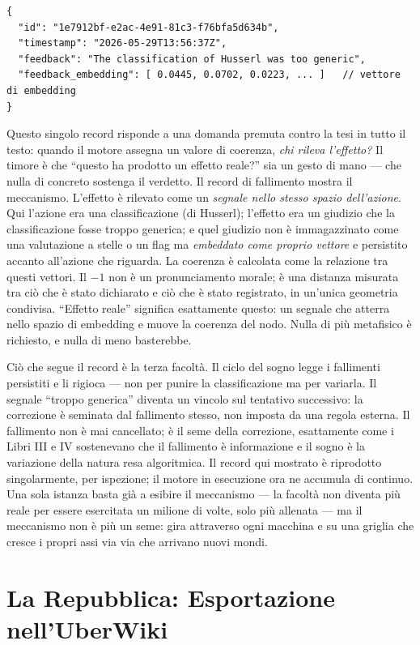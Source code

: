 \begin{lstlisting}
{
  "id": "1e7912bf-e2ac-4e91-81c3-f76bfa5d634b",
  "timestamp": "2026-05-29T13:56:37Z",
  "feedback": "The classification of Husserl was too generic",
  "feedback_embedding": [ 0.0445, 0.0702, 0.0223, ... ]   // vettore di embedding
}
\end{lstlisting}

Questo singolo record risponde a una domanda premuta contro la tesi in tutto il
testo: quando il motore assegna un valore di coerenza, \emph{chi rileva
l'effetto?} Il timore \`e che ``questo ha prodotto un effetto reale?'' sia un
gesto di mano --- che nulla di concreto sostenga il verdetto. Il record di
fallimento mostra il meccanismo. L'effetto \`e rilevato come un \emph{segnale
nello stesso spazio dell'azione}. Qui l'azione era una classificazione (di
Husserl); l'effetto era un giudizio che la classificazione fosse troppo generica;
e quel giudizio non \`e immagazzinato come una valutazione a stelle o un flag ma
\emph{embeddato come proprio vettore} e persistito accanto
all'azione che riguarda. La coerenza \`e calcolata come la relazione tra questi
vettori. Il $-1$ non \`e un pronunciamento morale; \`e una distanza misurata tra
ci\`o che \`e stato dichiarato e ci\`o che \`e stato registrato, in un'unica
geometria condivisa. ``Effetto reale'' significa esattamente questo: un segnale
che atterra nello spazio di embedding e muove la coerenza del nodo. Nulla di pi\`u
metafisico \`e richiesto, e nulla di meno basterebbe.

Ci\`o che segue il record \`e la terza facolt\`a. Il ciclo del sogno legge i
fallimenti persistiti e li rigioca --- non per punire la classificazione ma per
variarla. Il segnale ``troppo generica'' diventa un vincolo sul tentativo
successivo: la correzione \`e seminata dal fallimento stesso, non imposta da una
regola esterna. Il fallimento non \`e mai cancellato; \`e il seme della
correzione, esattamente come i Libri III e IV sostenevano che il fallimento \`e
informazione e il sogno \`e la variazione della natura resa algoritmica. Il
record qui mostrato \`e riprodotto singolarmente, per ispezione; il motore in
esecuzione ora ne accumula di continuo. Una sola istanza basta gi\`a a esibire il
meccanismo --- la facolt\`a non diventa pi\`u reale per essere esercitata un milione
di volte, solo pi\`u allenata --- ma il meccanismo non \`e pi\`u un seme: gira
attraverso ogni macchina e su una griglia che cresce i propri assi via via che
arrivano nuovi mondi.

\section{La Repubblica: Esportazione nell'UberWiki}

